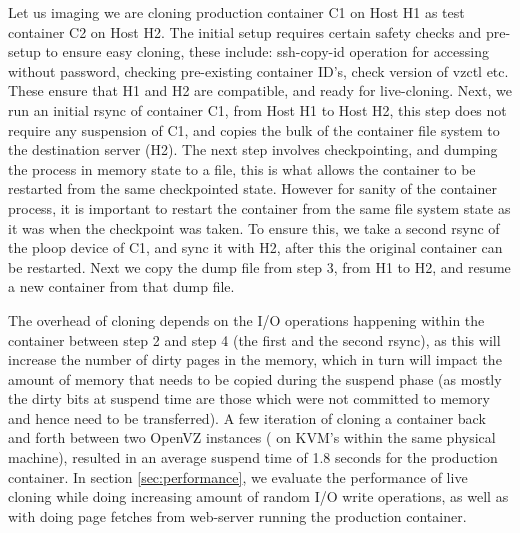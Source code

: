 Let us imaging we are cloning production container C1 on Host H1 as test container C2 on Host H2. 
The initial setup requires certain safety checks and pre-setup to ensure easy cloning, these include: ssh-copy-id operation for accessing without password, checking pre-existing container ID's, check version of vzctl etc. 
These ensure that H1 and H2 are compatible, and ready for live-cloning.
Next, we run an initial rsync of container C1, from Host H1 to Host H2, this step does not require any suspension of C1, and copies the bulk of the container file system to the destination server (H2). 
The next step involves checkpointing, and dumping the process in memory state to a file, this is what allows the container to be restarted from the same checkpointed state. 
However for sanity of the container process, it is important to restart the container from the same file system state as it was when the checkpoint was taken.
To ensure this, we take a second rsync of the ploop device of C1, and sync it with H2, after this the original container can be restarted.
Next we copy the dump file from step 3, from H1 to H2, and resume a new container from that dump file.

The overhead of cloning depends on the I/O operations happening within the container between step 2 and step 4 (the first and the second rsync), as this will increase the number of dirty pages in the memory, which in turn will impact the amount of memory that needs to be copied during the suspend phase (as mostly the dirty bits at suspend time are those which were not committed to memory and hence need to be transferred).  
A few iteration of cloning a container back and forth between two OpenVZ instances ( on KVM's within the same physical machine), resulted in an average suspend time of 1.8 seconds for the production container.
In section \ref{sec:performance}, we evaluate the performance of live cloning while doing increasing amount of random I/O write operations, as well as with doing page fetches  from web-server running the production container.


